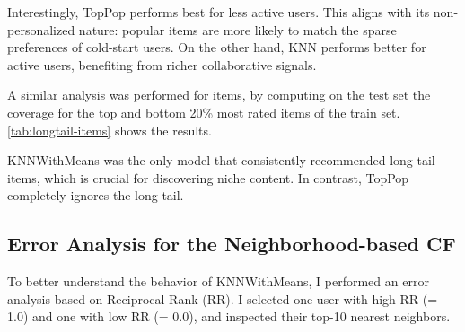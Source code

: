 \documentclass[11pt,a4paper]{article}
\begin{document}
\begin{table}[H]
\centering
{}
\caption{Hit Rate for Top and Bottom 20\% of Users}
\label{tab:longtail-users}
\end{table}

Interestingly, TopPop performs best for less active users. This aligns with its non-personalized nature: popular items are more likely to match the sparse preferences of cold-start users. On the other hand, KNN performs better for active users, benefiting from richer collaborative signals.

A similar analysis was performed for items, by computing on the test set the coverage for the top and bottom 20\% most rated items of the train set. \autoref{tab:longtail-items} shows the results.

\begin{table}[H]
\centering
{}
\caption{Coverage for Top and Bottom 20\% of Items}
\label{tab:longtail-items}
\end{table}

KNNWithMeans was the only model that consistently recommended long-tail items, which is crucial for discovering niche content. In contrast, TopPop completely ignores the long tail.

\subsection{Error Analysis for the Neighborhood-based CF}
To better understand the behavior of KNNWithMeans, I performed an error analysis based on Reciprocal Rank (RR). I selected one user with high RR (= 1.0) and one with low RR (= 0.0), and inspected their top-10 nearest neighbors.
\end{document}
